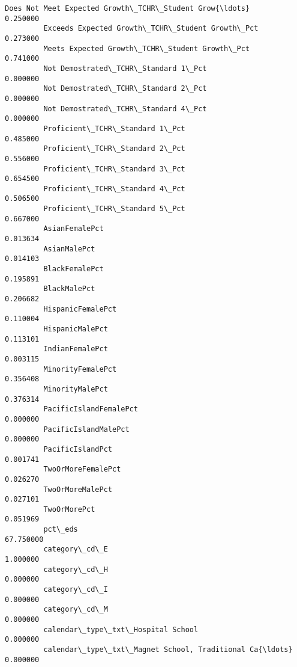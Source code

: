 \documentclass[11pt]{article}
\begin{document}
\begin{Verbatim}[commandchars=\\\{\}]
         Does Not Meet Expected Growth\_TCHR\_Student Grow{\ldots}       0.250000   
         Exceeds Expected Growth\_TCHR\_Student Growth\_Pct          0.273000   
         Meets Expected Growth\_TCHR\_Student Growth\_Pct            0.741000   
         Not Demostrated\_TCHR\_Standard 1\_Pct                      0.000000   
         Not Demostrated\_TCHR\_Standard 2\_Pct                      0.000000   
         Not Demostrated\_TCHR\_Standard 4\_Pct                      0.000000   
         Proficient\_TCHR\_Standard 1\_Pct                           0.485000   
         Proficient\_TCHR\_Standard 2\_Pct                           0.556000   
         Proficient\_TCHR\_Standard 3\_Pct                           0.654500   
         Proficient\_TCHR\_Standard 4\_Pct                           0.506500   
         Proficient\_TCHR\_Standard 5\_Pct                           0.667000   
         AsianFemalePct                                           0.013634   
         AsianMalePct                                             0.014103   
         BlackFemalePct                                           0.195891   
         BlackMalePct                                             0.206682   
         HispanicFemalePct                                        0.110004   
         HispanicMalePct                                          0.113101   
         IndianFemalePct                                          0.003115   
         MinorityFemalePct                                        0.356408   
         MinorityMalePct                                          0.376314   
         PacificIslandFemalePct                                   0.000000   
         PacificIslandMalePct                                     0.000000   
         PacificIslandPct                                         0.001741   
         TwoOrMoreFemalePct                                       0.026270   
         TwoOrMoreMalePct                                         0.027101   
         TwoOrMorePct                                             0.051969   
         pct\_eds                                                 67.750000   
         category\_cd\_E                                            1.000000   
         category\_cd\_H                                            0.000000   
         category\_cd\_I                                            0.000000   
         category\_cd\_M                                            0.000000   
         calendar\_type\_txt\_Hospital School                        0.000000   
         calendar\_type\_txt\_Magnet School, Traditional Ca{\ldots}       0.000000   

\end{Verbatim}
\end{document}
